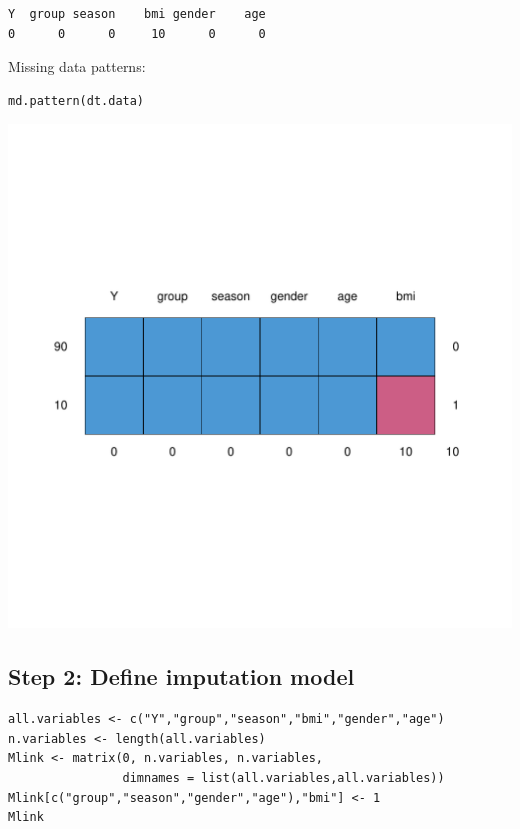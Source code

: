 \documentclass[12pt]{article}
\begin{document}
\begin{verbatim}
Y  group season    bmi gender    age 
0      0      0     10      0      0
\end{verbatim}

Missing data patterns:   
\lstset{language=r,label= ,caption= ,captionpos=b,numbers=none}
\begin{lstlisting}
md.pattern(dt.data)
\end{lstlisting}

\begin{center}
\includegraphics[width=.9\linewidth]{./missingDataPattern.pdf}
\end{center}

\clearpage

\subsection{Step 2: Define imputation model}
\label{sec:org643f39c}

\lstset{language=r,label= ,caption= ,captionpos=b,numbers=none}
\begin{lstlisting}
all.variables <- c("Y","group","season","bmi","gender","age")
n.variables <- length(all.variables)
Mlink <- matrix(0, n.variables, n.variables,
				dimnames = list(all.variables,all.variables))
Mlink[c("group","season","gender","age"),"bmi"] <- 1
Mlink
\end{lstlisting}
\end{document}
